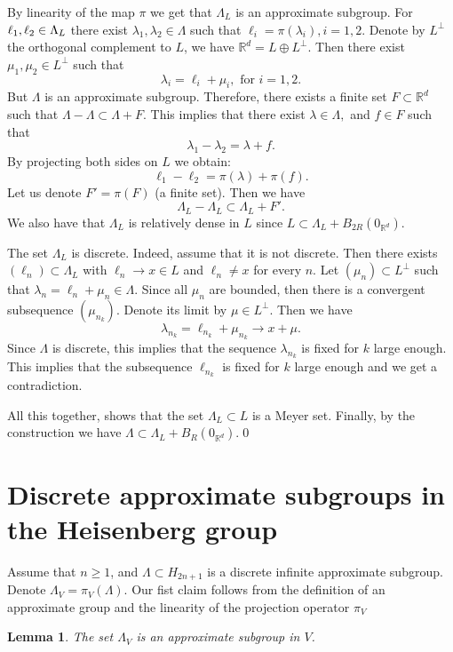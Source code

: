 \documentclass[10pt]{amsart}
\newcommand{\bR}{\mathbb{R}}
\newcounter{dummy} \numberwithin{dummy}{section}
\theoremstyle{plain}
\newtheorem{lemma}[dummy]{Lemma}
\theoremstyle{definition}
\begin{document}
By linearity of the map $\pi$ we get that $\Lambda_L$ is an approximate subgroup. For $\ell_1,\ell_2 \in\nobreak \Lambda_L$ there exist $\lambda_1,\lambda_2 \in \Lambda$ such that $\ell_i = \pi(\lambda_i), i = 1,2$. Denote by $L^{\perp}$ the orthogonal complement to $L$, \ie we have $\bR^d = L \oplus L^{\perp}$. Then there exist $\mu_1,\mu_2 \in L^{\perp}$ such that
\[
\lambda_i = \ell_i + \mu_i, \text{ for } i = 1,2.
\]
But $\Lambda$ is an approximate subgroup. Therefore, there exists a finite set $F \subset \bR^d$ such that $\Lambda - \Lambda \subset \Lambda + F$. This implies that there exist $\lambda \in \Lambda,$ and $f \in F$ such that
\[
\lambda_1 - \lambda_2 =\lambda + f.
\]
By projecting both sides on $L$ we obtain:
\[
\ell_1 - \ell_2 = \pi(\lambda) + \pi(f).
\]
Let us denote $F' = \pi(F)$ (a finite set). Then we have
\[
\Lambda_L - \Lambda_L \subset \Lambda_L + F'.
\]
We also have that $\Lambda_L$ is relatively dense in $L$ since $L \subset \Lambda_L + B_{2R}(0_{\bR^d})$.

The set $\Lambda_L$ is discrete. Indeed, assume that it is not discrete. Then there exists $(\ell_n) \subset \Lambda_L$ with $\ell_n \to x \in L$ and $\ell_n \neq x$ for every $n$. Let $(\mu_n) \subset L^{\perp}$ such that $\lambda_n = \ell_n + \mu_n \in \Lambda$. Since all $\mu_n$ are bounded, then there is a convergent subsequence $(\mu_{n_k})$. Denote its limit by $\mu \in L^{\perp}$. Then we have
\[
\lambda_{n_k} = \ell_{n_k} + \mu_{n_k} \to x + \mu.
\]
Since $\Lambda$ is discrete, this implies that the sequence $\lambda_{n_k}$ is fixed for $k$ large enough. This implies that the subsequence $\ell_{n_k}$ is fixed for $k$ large enough and we get a contradiction.

All this together, shows that the set $\Lambda_L \subset L$ is a Meyer set. Finally, by the construction we have $\Lambda \subset \Lambda_L + B_R(0_{\bR^d})$.\qed

\section{Discrete approximate subgroups in the Heisenberg group}

Assume that $n \ge 1$, and $\Lambda \subset H_{2n+1}$ is a discrete infinite approximate subgroup. Denote $\Lambda_V = \pi_V(\Lambda)$. Our fist claim follows from the definition of an approximate group and the linearity of the projection operator $\pi_V$

\begin{lemma}
\label{heis-lem-1}
The set $\Lambda_V$ is an approximate subgroup in $V$.
\end{lemma}
\end{document}
